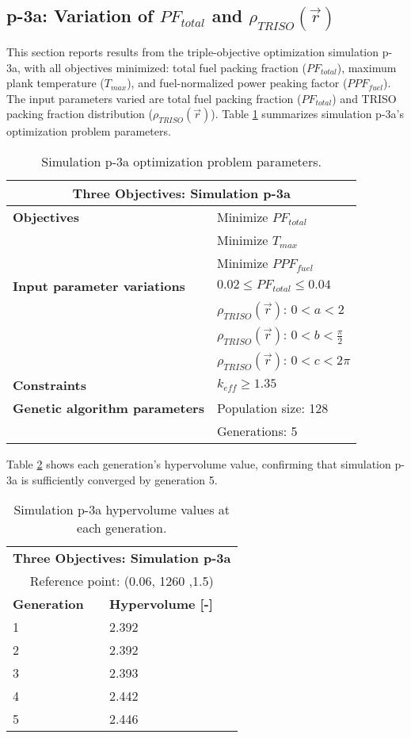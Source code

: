 \subsection{p-3a: Variation of $PF_{total}$ and $\rho_{TRISO}(\vec{r})$}
\label{sec:p-3a}
This section reports results from the triple-objective optimization simulation p-3a, 
with all objectives minimized: total fuel packing fraction ($PF_{total}$), 
maximum plank temperature ($T_{max}$), and fuel-normalized power peaking factor 
($PPF_{fuel}$).  
The input parameters varied are total fuel packing fraction ($PF_{total}$) and 
TRISO packing fraction distribution ($\rho_{TRISO}(\vec{r})$). 
Table \ref{tab:simulationp3a} summarizes simulation p-3a's optimization problem parameters. 
\begin{table}[htbp!]
    \centering
    \onehalfspacing
    \caption{Simulation p-3a optimization problem parameters.}
	\label{tab:simulationp3a}
    \footnotesize
    \begin{tabular}{l|p{4cm}}
    \hline 
    \multicolumn{2}{c}{\textbf{Three Objectives: Simulation p-3a}} \\
    \hline 
    \textbf{Objectives} & Minimize $PF_{total}$ \\
    & Minimize $T_{max}$ \\
    & Minimize $PPF_{fuel}$ \\
    \hline 
    \textbf{Input parameter variations} & $0.02 \leq PF_{total} \leq 0.04$ \\
    & $\rho_{TRISO}(\vec{r})$: $0<a<2$ \\
    & $\rho_{TRISO}(\vec{r})$: $0<b<\frac{\pi}{2}$ \\
    & $\rho_{TRISO}(\vec{r})$: $0<c<2\pi$ \\
    \hline
    \textbf{Constraints} & $k_{eff} \geq 1.35$\\ 
    \hline 
    \textbf{Genetic algorithm parameters} & Population size: 128 \\
    & Generations: 5 \\
    \hline
    \end{tabular}
\end{table}
Table \ref{tab:p3a-hypervolume} shows each generation's hypervolume value, 
confirming that simulation p-3a is sufficiently converged by generation 5. 
\begin{table}[htbp!]
    \centering
    \onehalfspacing
    \caption{Simulation p-3a hypervolume values at each generation.}
	\label{tab:p3a-hypervolume}
    \footnotesize
    \begin{tabular}{ll}
    \hline 
    \multicolumn{2}{c}{\textbf{Three Objectives: Simulation p-3a}} \\
    \multicolumn{2}{c}{Reference point: (0.06, 1260 ,1.5)} \\
    \hline 
    \textbf{Generation} & \textbf{Hypervolume [-]} \\
    \hline
    1 & 2.392 \\
    2 & 2.392 \\
    3 & 2.393 \\
    4 & 2.442 \\
    5 & 2.446 \\
    \hline
    \end{tabular}
\end{table}


